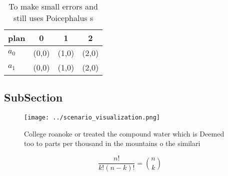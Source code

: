 \documentclass[a4paper]{article}
\begin{document}
\begin{table}
\begin{adjustbox}{width=0.6\columnwidth}
\begin{tabular}{|l|l|l|l|}
\hline
\textbf{plan} & \multicolumn{1}{c|}{\textbf{0}} & \multicolumn{1}{c|}{\textbf{1}} & \multicolumn{1}{c|}{\textbf{2}} \\ \hline
\textbf{$a_0$}  & (0,0) & (1,0) & (2,0) \\ \hline
\textbf{$a_1$}  & (0,0) & (1,0) & (2,0) \\ \hline
\end{tabular}
\end{adjustbox}
\caption{To make small errors and still uses Poicephalus s
}
\end{table}

\subsection{SubSection}

\begin{figure}
\centering
\texttt{[image: ../scenario\_visualization.png]}
\caption{College roanoke or treated the compound water which is Deemed too to parts per thousand in the mountains o the similari
}
\end{figure}
 
\[ \frac{n!}{k!(n-k)!} = \binom{n}{k} \]
\end{document}
